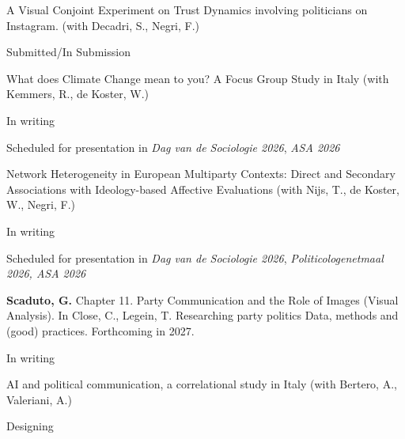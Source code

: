 \documentclass[10pt,]{article}
\providecommand{\tightlist}{%
  \setlength{\itemsep}{0pt}\setlength{\parskip}{0pt}}
\renewenvironment{itemize}{
  \begin{list}{}{
    \setlength{\leftmargin}{1.5em}
  }
}{
  \end{list}
}
\begin{document}
\begin{itemize}
\tightlist
\item
  A Visual Conjoint Experiment on Trust Dynamics involving politicians
  on Instagram. (with Decadri, S., Negri, F.)

  \begin{itemize}
  \tightlist
  \item
    Submitted/In Submission
  \end{itemize}
\end{itemize}

\begin{itemize}
\tightlist
\item
  What does Climate Change mean to you? A Focus Group Study in Italy
  (with Kemmers, R., de Koster, W.)

  \begin{itemize}
  \tightlist
  \item
    In writing
  \item
    Scheduled for presentation in \emph{Dag van de Sociologie 2026},
    \emph{ASA 2026}
  \end{itemize}
\end{itemize}

\begin{itemize}
\tightlist
\item
  Network Heterogeneity in European Multiparty Contexts: Direct and
  Secondary Associations with Ideology-based Affective Evaluations (with
  Nijs, T., de Koster, W., Negri, F.)

  \begin{itemize}
  \tightlist
  \item
    In writing
  \item
    Scheduled for presentation in \emph{Dag van de Sociologie 2026},
    \emph{Politicologenetmaal 2026, ASA 2026}
  \end{itemize}
\item
  \textbf{Scaduto, G.} Chapter 11. Party Communication and the Role of
  Images (Visual Analysis). In Close, C., Legein, T. Researching party
  politics Data, methods and (good) practices. Forthcoming in 2027.

  \begin{itemize}
  \tightlist
  \item
    In writing
  \end{itemize}
\end{itemize}

\begin{itemize}
\tightlist
\item
  AI and political communication, a correlational study in Italy (with
  Bertero, A., Valeriani, A.)

  \begin{itemize}
  \tightlist
  \item
    Designing
  \end{itemize}
\end{itemize}
\end{document}
